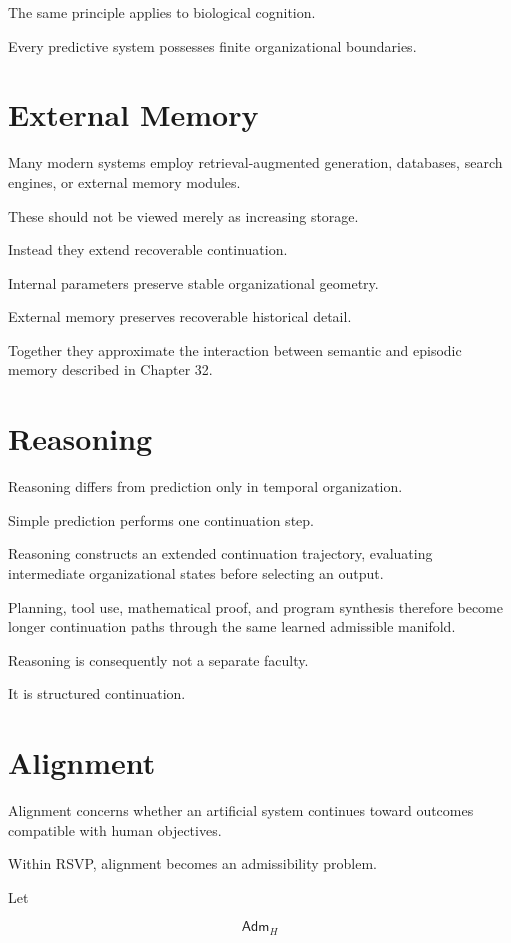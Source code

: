 \documentclass[11pt,oneside]{book}
\numberwithin{equation}{chapter}
\theoremstyle{definition}
\theoremstyle{plain}
\newcommand{\Adm}{\mathsf{Adm}}
\begin{document}
The same principle applies to biological cognition.

Every predictive system possesses finite organizational boundaries.

\section{External Memory}

Many modern systems employ retrieval-augmented generation, databases,
search engines, or external memory modules.

These should not be viewed merely as increasing storage.

Instead they extend recoverable continuation.

Internal parameters preserve stable organizational geometry.

External memory preserves recoverable historical detail.

Together they approximate the interaction between semantic and episodic
memory described in Chapter 32.

\section{Reasoning}

Reasoning differs from prediction only in temporal organization.

Simple prediction performs one continuation step.

Reasoning constructs an extended continuation trajectory, evaluating
intermediate organizational states before selecting an output.

Planning, tool use, mathematical proof, and program synthesis therefore
become longer continuation paths through the same learned admissible
manifold.

Reasoning is consequently not a separate faculty.

It is structured continuation.

\section{Alignment}

Alignment concerns whether an artificial system continues toward outcomes
compatible with human objectives.

Within RSVP, alignment becomes an admissibility problem.

Let

\[
\Adm_H
\]
\end{document}
